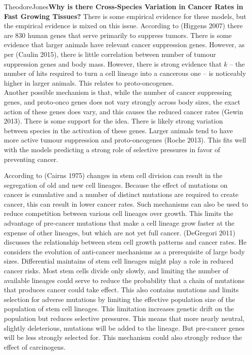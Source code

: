 \documentclass[12pt,letterpaper]{article}
\begin{document}
\begin{mla}{Theodore}{Jones}{}{}{}{\textbf{Why is there Cross-Species Variation in Cancer Rates in Fast Growing Tissues?}}
There is some empirical evidence for these models, but the empirical evidence is mixed on this issue. According to (Higgens 2007) there are 830 human genes that serve primarily to suppress tumors. There is some evidence that larger animals have relevant cancer suppression genes.  However, as per (Caulin 2015), there is little correlation between number of tumour suppression genes and body mass. However, there is strong evidence that $k$ -- the number of hits required to turn a cell lineage into a cancerous one -- is noticeably higher in larger animals. This relates to proto-oncogenes.  \\

Another possible mechanism is that, while the number of cancer suppressing genes, and proto-onco genes does not vary strongly across body sizes, the exact action of these genes does vary, and this causes the reduced cancer rates (Gewin 2013). There is some support for the idea.  There is likely strong variation between species in the activation of these genes. Larger animals tend to have more active tumour suppression and proto-oncogenes (Roche 2013). This fits well with the models predicting a strong role of selective pressures in favor of preventing cancer.

According to (Cairns 1975) changes in stem cell division can result in the segregation of old and new cell lineages. Because the effect of mutations on cancer is cumulative and a number of distinct mutations are required to create cancer, this can result in lower cancer rates. Such mechanisms can also be used to reduce competition between various cell lineages over growth. This limits the advantage of pre-cancer mutations that make a cell lineage grow faster at the expense of other lineages, but which are not yet full cancer. (DeGregori 2011) discusses the relationship between stem cell growth patterns and cancer rates. He considers the evolution of anti-cancer mechanisms as a prerequisite of large body sizes. Differential maintains of stem cell lineages might play a role in reduced cancer risks. Most stem cells divide only slowly, and limiting the number of available lineages could serve to reduce the probability that a chain of mutations that produces cancer could take effect. This also contains mutations and limits selection for adverse mutations by limiting the effective population size of the population of stem cell lineages. This limitation increases genetic drift on the population but reduces selective pressures. This means that more nearly neutral, slightly deleterious, mutations will be added to the lineage. But pre-cancer genes will be less strongly selected for. This mechanism could also strongly reduce the effect of carcinogens. 


\end{mla}
\end{document}
